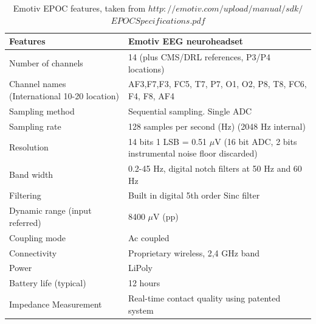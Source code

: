 \begin{table}[ht]
\centering
\tabulinesep=1.5mm
\begin{tabu}{| m{.47\linewidth} | m{.47\linewidth} |}
			
			\hline 
			\textbf{Features} & \textbf{Emotiv EEG neuroheadset}  \\
			\hline 
			Number of channels & 14 (plus CMS/DRL references, P3/P4 locations)   \\
			\hline 
			Channel names (International 10-20 location)  & AF3,F7,F3, FC5, T7, P7, O1, O2, P8, T8, FC6, F4, F8, AF4  \\
			\hline 
			Sampling method & Sequential sampling. Single ADC \\
			\hline 
			Sampling rate & 128 samples per second (Hz) (2048 Hz internal) \\
			\hline
			Resolution & 14 bits 1 LSB = 0.51 $\mu$V (16 bit ADC, 2 bits instrumental noise floor discarded) \\
			\hline
			Band width & 0.2-45 Hz, digital notch filters at 50 Hz and 60 Hz\\
			\hline
			Filtering & Built in digital 5th order Sinc filter\\
            \hline
			Dynamic range (input referred) & 8400 $\mu$V (pp)\\
            \hline
			Coupling mode & Ac coupled\\
            \hline
			Connectivity & Proprietary wireless, 2,4 GHz band\\
            \hline
			Power & LiPoly \\
            \hline
			Battery life (typical) & 12 hours \\
            \hline
			Impedance Measurement & Real-time contact quality using patented system \\
            \hline
		\end{tabu}
        
\caption{Emotiv EPOC features, taken from \textbf{$http://emotiv.com/upload/manual/sdk/$
$EPOCSpecifications.pdf$}}
\label{table:1}
\end{table}




